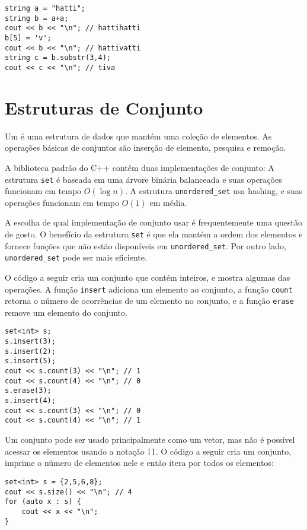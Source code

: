 \begin{lstlisting}
string a = "hatti";
string b = a+a;
cout << b << "\n"; // hattihatti
b[5] = 'v';
cout << b << "\n"; // hattivatti
string c = b.substr(3,4);
cout << c << "\n"; // tiva
\end{lstlisting}

\section{Estruturas de Conjunto}


Um  é uma estrutura de dados que
mantém uma coleção de elementos.
As operações básicas de conjuntos são inserção de elemento,
pesquisa e remoção.

A biblioteca padrão do C++ contém duas implementações de conjunto:
A estrutura \texttt{set} é baseada em uma árvore binária balanceada e suas operações funcionam em tempo $O(\log n)$.
A estrutura \texttt{unordered\_set} usa hashing,
e suas operações funcionam em tempo $O(1)$ em média.

A escolha de qual implementação de conjunto usar
é frequentemente uma questão de gosto.
O benefício da estrutura \texttt{set}
é que ela mantém a ordem dos elementos
e fornece funções que não estão disponíveis
em \texttt{unordered\_set}.
Por outro lado, \texttt{unordered\_set}
pode ser mais eficiente.

O código a seguir cria um conjunto
que contém inteiros,
e mostra algumas das operações.
A função \texttt{insert} adiciona um elemento ao conjunto,
a função \texttt{count} retorna o número de ocorrências
de um elemento no conjunto,
e a função \texttt{erase} remove um elemento do conjunto.

\begin{lstlisting}
set<int> s;
s.insert(3);
s.insert(2);
s.insert(5);
cout << s.count(3) << "\n"; // 1
cout << s.count(4) << "\n"; // 0
s.erase(3);
s.insert(4);
cout << s.count(3) << "\n"; // 0
cout << s.count(4) << "\n"; // 1
\end{lstlisting}

Um conjunto pode ser usado principalmente como um vetor,
mas não é possível acessar
os elementos usando a notação \texttt{[]}.
O código a seguir cria um conjunto,
imprime o número de elementos nele e então
itera por todos os elementos:
\begin{lstlisting}
set<int> s = {2,5,6,8};
cout << s.size() << "\n"; // 4
for (auto x : s) {
    cout << x << "\n";
}
\end{lstlisting}

